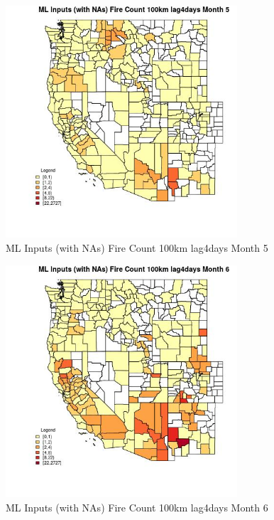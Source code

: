 \clearpage 

\begin{figure} 
\centering  
\includegraphics[width=0.77\textwidth]{Code_Outputs/Report_ML_input_PM25_Step4_part_f_de_duplicated_aveswNAs_CountyFire_Count_100km_lag4daysmedianMonth5.jpg} 
\caption{\label{fig:Report_ML_input_PM25_Step4_part_f_de_duplicated_aveswNAsCountyFire_Count_100km_lag4daysmedianMonth5}ML Inputs (with NAs) Fire Count 100km lag4days Month 5} 
\end{figure} 
 

\begin{figure} 
\centering  
\includegraphics[width=0.77\textwidth]{Code_Outputs/Report_ML_input_PM25_Step4_part_f_de_duplicated_aveswNAs_CountyFire_Count_100km_lag4daysmedianMonth6.jpg} 
\caption{\label{fig:Report_ML_input_PM25_Step4_part_f_de_duplicated_aveswNAsCountyFire_Count_100km_lag4daysmedianMonth6}ML Inputs (with NAs) Fire Count 100km lag4days Month 6} 
\end{figure} 
 

